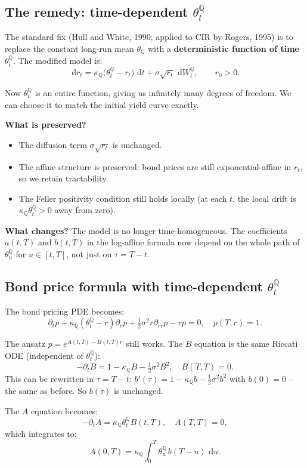 \documentclass[11pt]{article}
\newcommand{\QQ}{\mathbb{Q}}
\newcommand{\dd}{\,\mathrm{d}}
\begin{document}
\subsection{The remedy: time-dependent $\theta_t^\QQ$}

The standard fix (Hull and White, 1990; applied to CIR by Rogers, 1995) is
to replace the constant long-run mean $\theta_\QQ$ with a
\textbf{deterministic function of time} $\theta_t^\QQ$.  The modified
model is:
\[
\dd r_t = \kappa_\QQ\big(\theta_t^\QQ - r_t\big)\,\dd t
+ \sigma\sqrt{r_t}\,\dd W_t^\QQ, \qquad r_0 > 0.
\]

Now $\theta_t^\QQ$ is an entire function, giving us infinitely many degrees
of freedom.  We can choose it to match the initial yield curve exactly.

\textbf{What is preserved?}
\begin{itemize}
  \item The diffusion term $\sigma\sqrt{r_t}$ is unchanged.
  \item The affine structure is preserved: bond prices are still
  exponential-affine in $r_t$, so we retain tractability.
  \item The Feller positivity condition still holds locally (at each $t$,
  the local drift is $\kappa_\QQ\theta_t^\QQ > 0$ away from zero).
\end{itemize}

\textbf{What changes?}  The model is no longer time-homogeneous.
The coefficients $a(t,T)$ and $b(t,T)$ in the log-affine formula now
depend on the whole path of $\theta_u^\QQ$ for $u \in [t,T]$, not just
on $\tau = T-t$.

\subsection{Bond price formula with time-dependent $\theta_t^\QQ$}

The bond pricing PDE becomes:
\[
\partial_t p + \kappa_\QQ(\theta_t^\QQ - r)\partial_r p
+ \tfrac{1}{2}\sigma^2 r\partial_{rr}p - rp = 0,
\quad p(T,r) = 1.
\]

The ansatz $p = e^{A(t,T)-B(t,T)r}$ still works.  The $B$ equation is the
same Riccati ODE (independent of $\theta_t^\QQ$):
\[
-\partial_t B = 1 - \kappa_\QQ B - \tfrac{1}{2}\sigma^2 B^2,
\quad B(T,T) = 0.
\]
This can be rewritten in $\tau = T-t$: $b'(\tau) = 1 - \kappa_\QQ b -
\tfrac{1}{2}\sigma^2 b^2$ with $b(0)=0$ -- the same as before.  So $b(\tau)$
is unchanged.

The $A$ equation becomes:
\[
-\partial_t A = \kappa_\QQ\theta_t^\QQ B(t,T),
\quad A(T,T) = 0,
\]
which integrates to:
\[
A(0,T) = \kappa_\QQ\int_0^T \theta_u^\QQ\,b(T-u)\,\dd u.
\]
\end{document}
